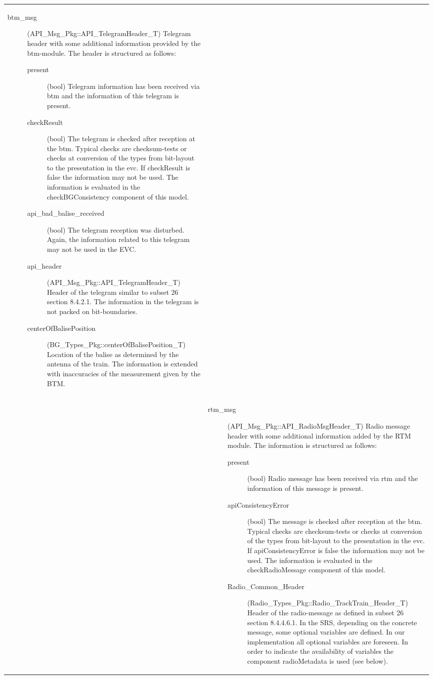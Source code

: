\begin{longtable}{p{}p{}}
\begin{description}
\item[btm\_msg](API\_Msg\_Pkg::API\_TelegramHeader\_T) Telegram header with some additional information provided by the btm-module. The header is structured as follows:
\begin{description}
\item[present](bool) Telegram information has been received via btm and the information of this telegram is present. 
\item[checkResult](bool) The telegram is checked after reception at the btm. Typical checks are checksum-tests or checks at conversion of the types from bit-layout to the presentation in the evc. If checkResult is false the information may not be used. The information is evaluated in the checkBGConsistency component of this model.
\item[api\_bad\_balise\_received](bool) The telegram reception was disturbed. Again, the information related to this telegram may not be used in the EVC.
\item[api\_header](API\_Msg\_Pkg::API\_TelegramHeader\_T) Header of the telegram similar to subset 26 section 8.4.2.1. The information in the telegram is not packed on bit-boundaries.
\item[centerOfBalisePosition](BG\_Types\_Pkg::centerOfBalisePosition\_T) Location of the balise as determined by the antenna of the train. The information is extended with inaccuracies of the measurement given by the BTM.
\end{description}
\end{description}\\
&
\begin{description}
\item[rtm\_msg](API\_Msg\_Pkg::API\_RadioMsgHeader\_T) Radio message header with some additional information added by the RTM module. The information is structured as follows:
\begin{description}
\item[present](bool) Radio message has been received via rtm and the information of this message is present. 
\item[apiConsistencyError](bool) The message is checked after reception at the btm. Typical checks are checksum-tests or checks at conversion of the types from bit-layout to the presentation in the evc. If apiConsistencyError is false the information may not be used. The information is evaluated in the checkRadioMessage component of this model.
\item[Radio\_Common\_Header](Radio\_Types\_Pkg::\newline Radio\_TrackTrain\_Header\_T) Header of the radio-message as defined in subset 26 section 8.4.4.6.1. In the SRS, depending on the concrete message, some optional variables are defined. In our implementation all optional variables are foreseen. In order to indicate the availability of variables the component radioMetadata is used (see below).

\end{description}
\end{description}
\end{longtable}
